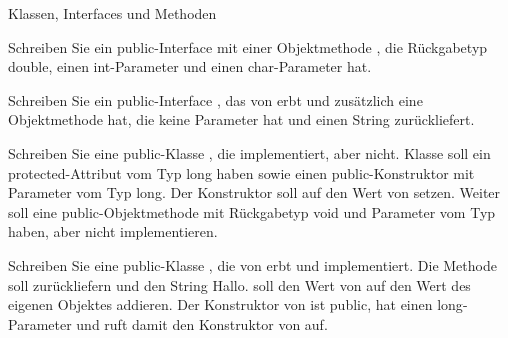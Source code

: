 \documentclass{../preamble}
\begin{document}
\clearpage

\begin{task}[credit = \stars{3}{3}]{Klassen, Interfaces und Methoden}
    \begin{subtask}
        Schreiben Sie ein \textcolor{keywordcolor}{public}-Interface  mit einer Objektmethode , die Rückgabetyp \textcolor{keywordcolor}{double}, einen \textcolor{keywordcolor}{int}-Parameter  und einen \textcolor{keywordcolor}{char}-Parameter  hat.

        \begin{solution}
            
        \end{solution}
    \end{subtask}

    \begin{subtask}
        Schreiben Sie ein \textcolor{keywordcolor}{public}-Interface , das von  erbt und zusätzlich eine Objektmethode  hat, die keine Parameter hat und einen \textcolor{keywordcolor}{String} zurückliefert.

        \begin{solution}
            
        \end{solution}
    \end{subtask}

    \clearpage

    \begin{subtask}
        Schreiben Sie eine \textcolor{keywordcolor}{public}-Klasse , die  implementiert, aber  nicht. Klasse  soll ein \textcolor{keywordcolor}{protected}-Attribut  vom  Typ \textcolor{keywordcolor}{long} haben sowie einen \textcolor{keywordcolor}{public}-Konstruktor  mit Parameter  vom Typ \textcolor{keywordcolor}{long}. Der Konstruktor soll  auf den Wert von  setzen. Weiter soll  eine \textcolor{keywordcolor}{public}-Objektmethode  mit Rückgabetyp \textcolor{keywordcolor}{void} und Parameter  vom Typ  haben, aber nicht implementieren.

        \begin{solution}
            
        \end{solution}
    \end{subtask}

    \begin{subtask}
        Schreiben Sie eine \textcolor{keywordcolor}{public}-Klasse , die von  erbt und  implementiert. Die Methode  soll  zurückliefern und  den String \textcolor{stringcolor}{\grqq Hallo\grqq}.  soll den Wert  von  auf den Wert  des eigenen Objektes addieren. Der Konstruktor von  ist \textcolor{keywordcolor}{public}, hat einen \textcolor{keywordcolor}{long}-Parameter  und ruft damit den Konstruktor von  auf.
    \end{subtask}


\end{task}
\end{document}
